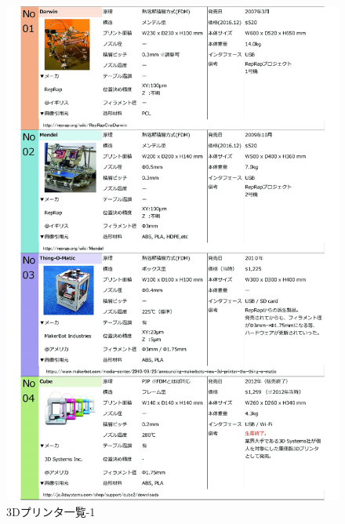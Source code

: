 \begin{figure}[htbp]
\centering
\includegraphics[width=380pt]{fig/fig24_cmyk.jpg}
\caption{3Dプリンタ一覧-1}
\label{fig24}
\end{figure}

